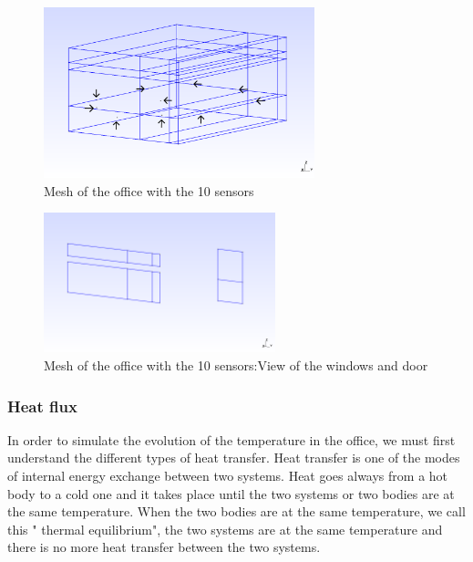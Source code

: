  \begin{figure}[H]
        \centering
		\includegraphics[width=0.7\textwidth]{"images/enkf/Maillage_1.png"}
		\caption{Mesh of the office with the 10 sensors}
\end{figure}
 \begin{figure}[H]
        \centering
		\includegraphics[width=0.6\textwidth]{"images/enkf/Maillage_2.png"}
		\caption{Mesh of the office with the 10 sensors:View of the windows and door}
\end{figure}
\subsubsection{Heat flux}
\noindent In order to simulate the evolution of the temperature in the office, we must first understand the different types of heat transfer. Heat transfer is one of the modes of internal energy exchange between two systems. Heat goes always from a hot body to a cold one and it takes place until the two systems or two bodies are at the same temperature. When the two bodies are at the same temperature, we call this " thermal equilibrium", the two systems are at the same temperature and there is no more heat transfer between the two systems.

